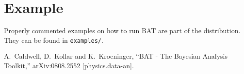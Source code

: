 \documentclass[11pt, a4paper]{article}
\begin{document}
\section{Example} 
\label{section:example}

Properly commented examples on how to run {\sc BAT} are part of the
distribution. They can be found in \verb|examples/|.



\begin{thebibliography}{99}
  A.~Caldwell, D.~Kollar and K.~Kroeninger,
  ``BAT - The Bayesian Analysis Toolkit,''
  arXiv:0808.2552 [physics.data-an].
\end{thebibliography}

\end{document}
